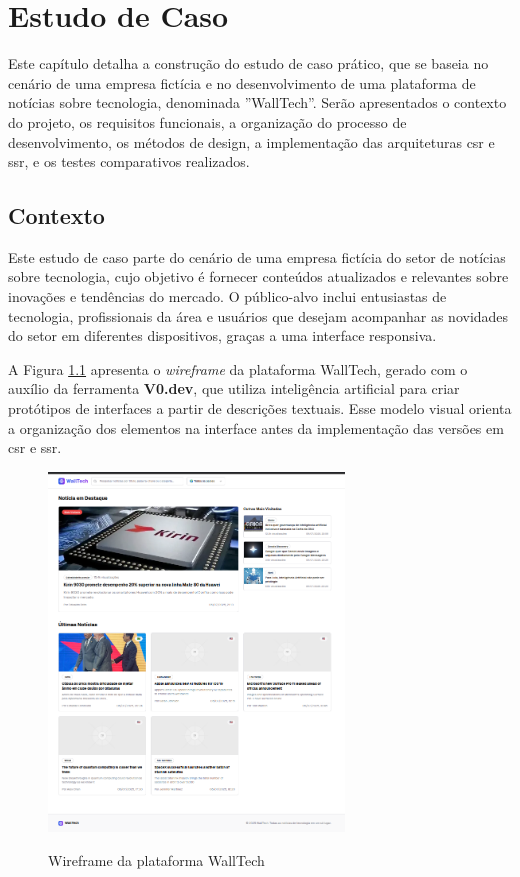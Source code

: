 \chapter{Estudo de Caso}
\label{cap:estudo_caso_dev}

Este capítulo detalha a construção do estudo de caso prático, que se baseia no cenário de uma empresa fictícia e no desenvolvimento de uma plataforma de notícias sobre tecnologia, denominada ''WallTech''. Serão apresentados o contexto do projeto, os requisitos funcionais, a organização do processo de desenvolvimento, os métodos de design, a implementação das arquiteturas \acrshort{csr} e \acrshort{ssr}, e os testes comparativos realizados.

\section{Contexto}
\label{section:contexto}

Este estudo de caso parte do cenário de uma empresa fictícia do setor de notícias sobre tecnologia, cujo objetivo é fornecer conteúdos atualizados e relevantes sobre inovações e tendências do mercado. O público-alvo inclui entusiastas de tecnologia, profissionais da área e usuários que desejam acompanhar as novidades do setor em diferentes dispositivos, graças a uma interface responsiva.

A Figura \ref{fig:wireframe-walltech} apresenta o \textit{wireframe} da plataforma WallTech, gerado com o auxílio da ferramenta \textbf{V0.dev}, que utiliza inteligência artificial para criar protótipos de interfaces a partir de descrições textuais. Esse modelo visual orienta a organização dos elementos na interface antes da implementação das versões em \acrshort{csr} e \acrshort{ssr}.

\begin{figure}[H]
  \centering
  \caption{Wireframe da plataforma WallTech}
  \includegraphics[width=0.7\textwidth]{media/wall_tech_wireframe.png}
  \label{fig:wireframe-walltech}
\end{figure}


